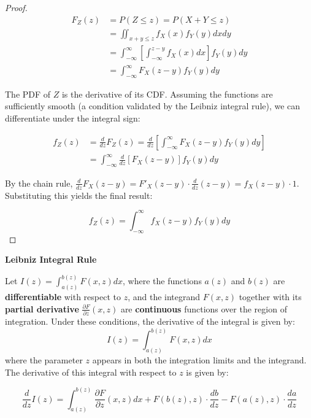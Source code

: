 \documentclass[../main.tex]{subfiles}
\begin{document}
\begin{proof}
    
\begin{align*}
F_Z(z) &= P(Z \leq z) = P(X + Y \leq z)\\
&= \iint_{x+y \leq z} f_X(x) f_Y(y)  dx  dy\\
&= \int_{-\infty}^{\infty} \left[ \int_{-\infty}^{z-y} f_X(x)  dx \right] f_Y(y)  dy\\
&= \int_{-\infty}^{\infty} F_X(z - y) f_Y(y)  dy
\end{align*}

The PDF of $Z$ is the derivative of its CDF. Assuming the functions are sufficiently smooth (a condition validated by the Leibniz integral rule), we can differentiate under the integral sign:

\begin{align*}
f_Z(z) &= \frac{d}{dz} F_Z(z) = \frac{d}{dz} \left[ \int_{-\infty}^{\infty} F_X(z - y) f_Y(y)  dy \right] \\
        &= \int_{-\infty}^{\infty} \frac{d}{dz} \left[ F_X(z - y) \right] f_Y(y)  dy
\end{align*}

By the chain rule, $\frac{d}{dz} F_X(z - y) = F'_X(z - y) \cdot \frac{d}{dz}(z - y) = f_X(z - y) \cdot 1$. Substituting this yields the final result:

\begin{equation*}
f_Z(z) = \int_{-\infty}^{\infty} f_X(z - y) f_Y(y)  dy
\end{equation*}
\end{proof}

\begin{yellow}
\begin{theorem}

\textbf{Leibniz Integral Rule}

Let $I(z) = \int_{a(z)}^{b(z)} F(x, z)  dx$, where the functions $a(z)$ and $b(z)$ are \textbf{differentiable} with respect to $z$, and the integrand $F(x, z)$ together with its \textbf{partial derivative} $\frac{\partial F}{\partial z}(x, z)$ are \textbf{continuous} functions over the region of integration. Under these conditions, the derivative of the integral is given by:
$$
I(z) = \int_{a(z)}^{b(z)} F(x, z)  dx
$$
where the parameter $z$ appears in both the integration limits and the integrand. The derivative of this integral with respect to $z$ is given by:

\begin{equation*}
\frac{d}{dz} I(z) = \int_{a(z)}^{b(z)} \frac{\partial F}{\partial z}(x, z)  dx + F(b(z), z) \cdot \frac{db}{dz} - F(a(z), z) \cdot \frac{da}{dz}
\end{equation*}

\end{theorem}
\end{yellow}
\end{document}
